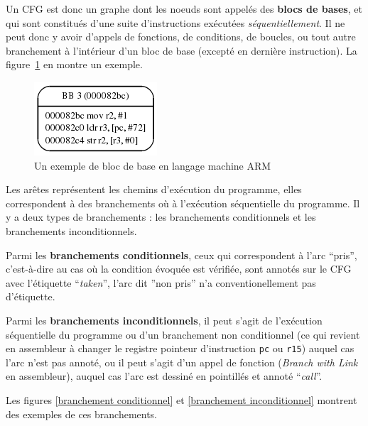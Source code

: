 \documentclass[french]{article}
\begin{document}
  Un CFG est donc un graphe dont les noeuds sont appelés des \textbf{blocs de bases}, et qui sont constitués d'une suite d'instructions exécutées \textit{séquentiellement}. Il ne peut donc y avoir d'appels de fonctions, de conditions, de boucles, ou tout autre branchement à l'intérieur d'un bloc de base (excepté en dernière instruction). La figure~\ref{bloc de base} en montre un exemple.
  
  \begin{figure}
    \centering
    \includegraphics[scale=0.5]{pictures/basicblock.png}
    \caption{Un exemple de bloc de base en langage machine ARM}
    \label{bloc de base}
  \end{figure}
  
  Les arêtes représentent les chemins d'exécution du programme, elles correspondent à des branchements où à l'exécution séquentielle du programme. Il y a deux types de branchements : les branchements conditionnels et les branchements inconditionnels.
  
  Parmi les \textbf{branchements conditionnels}, ceux qui correspondent à l'arc ``pris'', c'est-à-dire au cas où la condition évoquée est vérifiée, sont annotés sur le CFG avec l'étiquette ``\textit{taken}'', l'arc dit ''non pris'' n'a conventionellement pas d'étiquette.
  
  Parmi les \textbf{branchements inconditionnels}, il peut s'agit de l'exécution séquentielle du programme ou d'un branchement non conditionnel (ce qui revient en assembleur à changer le registre pointeur d'instruction \texttt{pc} ou \texttt{r15}) auquel cas l'arc n'est pas annoté, ou il peut s'agit d'un appel de fonction (\textit{Branch with Link} en assembleur), auquel cas l'arc est dessiné en pointillés et annoté ``\textit{call}''.
  
  Les figures \ref{branchement conditionnel} et \ref{branchement inconditionnel} montrent des exemples de ces branchements.
  
\end{document}
